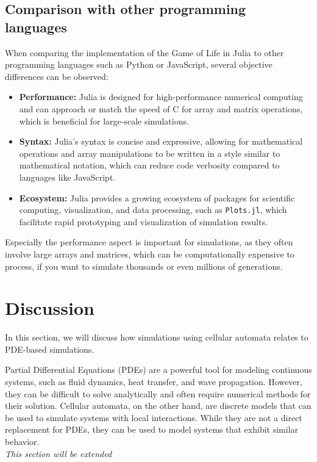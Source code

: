 \documentclass[a4paper,12pt]{llncs}
\numberwithin{equation}{section}
\begin{document}
\subsection{Comparison with other programming languages}
When comparing the implementation of the Game of Life in Julia to other programming languages such as Python or JavaScript, several objective differences can be observed:
\begin{itemize}
  \item \textbf{Performance:} Julia is designed for high-performance numerical computing and can approach or match the speed of C for array and matrix operations, which is beneficial for large-scale simulations.
  \item \textbf{Syntax:} Julia's syntax is concise and expressive, allowing for mathematical operations and array manipulations to be written in a style similar to mathematical notation, which can reduce code verbosity compared to languages like JavaScript.
  \item \textbf{Ecosystem:} Julia provides a growing ecosystem of packages for scientific computing, visualization, and data processing, such as \texttt{Plots.jl}, which facilitate rapid prototyping and visualization of simulation results.
\end{itemize}
Especially the performance aspect is important for simulations, as they often involve large arrays and matrices,
which can be computationally expensive to process, if you want to simulate thousands or even millions of generations.
\section{Discussion}
In this section, we will discuss how simulations using cellular automata relates to PDE-based simulations.

Partial Differential Equations (PDEs) are a powerful tool for modeling continuous systems, such as fluid dynamics, heat transfer, and wave propagation.
However, they can be difficult to solve analytically and often require numerical methods for their solution.
Cellular automata, on the other hand, are discrete models that can be used to simulate systems with local interactions.
While they are not a direct replacement for PDEs, they can be used to model systems that exhibit similar behavior.\\
\textit{This section will be extended}
\end{document}
